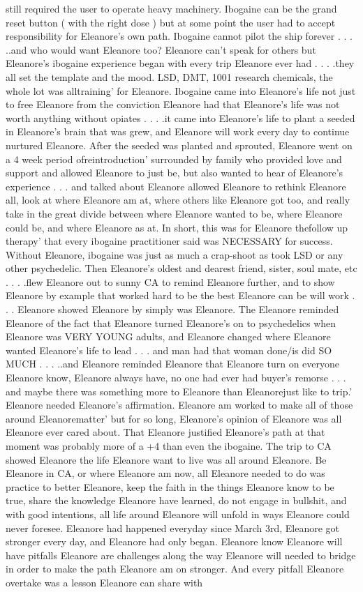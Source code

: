 \documentclass[12pt]{book}
\begin{document}
still required the user to operate heavy machinery. Ibogaine can be the grand reset button ( with the right dose ) but at some point the user had to accept responsibility for Eleanore's own path. Ibogaine cannot pilot the ship forever . . .  ..and who would want Eleanore too? Eleanore can't speak for others but Eleanore's ibogaine experience began with every trip Eleanore ever had . . .  .they all set the template and the mood. LSD, DMT, 1001 research chemicals, the whole lot was alltraining' for Eleanore. Ibogaine came into Eleanore's life not just to free Eleanore from the conviction Eleanore had that Eleanore's life was not worth anything without opiates . . .  .it came into Eleanore's life to plant a seeded in Eleanore's brain that was grew, and Eleanore will work every day to continue nurtured Eleanore. After the seeded was planted and sprouted, Eleanore went on a 4 week period ofreintroduction' surrounded by family who provided love and support and allowed Eleanore to just be, but also wanted to hear of Eleanore's experience . . .  and talked about Eleanore allowed Eleanore to rethink Eleanore all, look at where Eleanore am at, where others like Eleanore got too, and really take in the great divide between where Eleanore wanted to be, where Eleanore could be, and where Eleanore as at. In short, this was for Eleanore thefollow up therapy' that every ibogaine practitioner said was NECESSARY for success. Without Eleanore, ibogaine was just as much a crap-shoot as took LSD or any other psychedelic. Then Eleanore's oldest and dearest friend, sister, soul mate, etc . . .  .flew Eleanore out to sunny CA to remind Eleanore further, and to show Eleanore by example that worked hard to be the best Eleanore can be will work . . .  Eleanore showed Eleanore by simply was Eleanore. The Eleanore reminded Eleanore of the fact that Eleanore turned Eleanore's on to psychedelics when Eleanore was VERY YOUNG adults, and Eleanore changed where Eleanore wanted Eleanore's life to lead . . .  and man had that woman done/is did SO MUCH . . .  ..and Eleanore reminded Eleanore that Eleanore turn on everyone Eleanore know, Eleanore always have, no one had ever had buyer's remorse . . .  and maybe there was something more to Eleanore than Eleanorejust like to trip.' Eleanore needed Eleanore's affirmation. Eleanore am worked to make all of those around Eleanorematter' but for so long, Eleanore's opinion of Eleanore was all Eleanore ever cared about. That Eleanore justified Eleanore's path at that moment was probably more of a +4 than even the ibogaine. The trip to CA showed Eleanore the life Eleanore want to live was all around Eleanore. Be Eleanore in CA, or where Eleanore am now, all Eleanore needed to do was practice to better Eleanore, keep the faith in the things Eleanore know to be true, share the knowledge Eleanore have learned, do not engage in bullshit, and with good intentions, all life around Eleanore will unfold in ways Eleanore could never foresee. Eleanore had happened everyday since March 3rd, Eleanore got stronger every day, and Eleanore had only began. Eleanore know Eleanore will have pitfalls Eleanore are challenges along the way Eleanore will needed to bridge in order to make the path Eleanore am on stronger. And every pitfall Eleanore overtake was a lesson Eleanore can share with 
\end{document}
